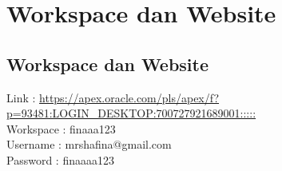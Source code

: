 \chapter{Workspace dan Website}
\section{Workspace dan Website}
Link : \url{https://apex.oracle.com/pls/apex/f?p=93481:LOGIN_DESKTOP:700727921689001:::::}\\
Workspace : finaaa123\\
Username : mrshafina@gmail.com\\
Password : finaaaa123\\